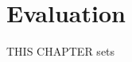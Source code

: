 \chapter{Evaluation}{}
\label{sec:eval}

\lettrine[lraise=0.1, nindent=0em, slope=-.5em]{T} {HIS CHAPTER} sets
